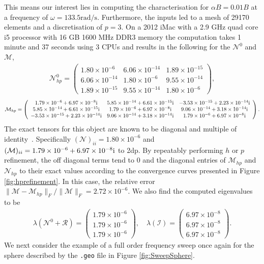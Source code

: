 \noindent
This means our interest lies in computing the characterisation for $ \alpha B = 0.01 B$ at a frequency of $\omega = 133.5 \text{rad/s}$.
Furthermore, the inputs led to a mesh of 29170 elements and a discretisation of $p=3$. On a 2012 iMac with a 2.9 GHz quad core i5 processor with 16 GB 1600 MHz DDR3 memory the computation takes 1 minute and 37 seconds using $3$ CPUs and results in the following for the $\mathcal{N}^0$ and $\mathcal{M}$,
\begin{align*}
\mathcal{N}_{hp}^0 = \left(\begin{array}{ccc}
1.80\times10^{-6} & 6.06\times10^{-14} & 1.89\times10^{-15}\\
6.06\times10^{-14} & 1.80\times10^{-6} & 9.55\times10^{-14}\\
1.89\times10^{-15} & 9.55\times10^{-14} & 1.80\times10^{-6}
\end{array}\right),
\end{align*}
\begin{align*}
\mathcal{M}_{hp} = \left(\begin{array}{ccc}
1.79\times10^{-6}+6.97\times10^{-8}\rm{i} & 5.85\times10^{-14}+6.61\times10^{-15}\rm{i} & -3.53\times10^{-15}+2.23\times10^{-14}\rm{i}\\
5.85\times10^{-14}+6.61\times10^{-15}\rm{i} & 1.79\times10^{-6}+6.97\times10^{-8}\rm{i} & 9.06\times10^{-14}+3.18\times10^{-14}\rm{i}\\
-3.53\times10^{-15}+2.23\times10^{-14}\rm{i} & 9.06\times10^{-14}+3.18\times10^{-14}\rm{i} & 1.79\times10^{-6}+6.97\times10^{-8}\rm{i}
\end{array}\right).
\end{align*}
The exact tensors for this object are known to be diagonal and multiple of identity~\cite{LedgerLionheart2018,Wait1951}. Specifically $(\mathcal{N})_{ii} = 1.80 \times 10^{-6} $ and $(\mathcal{M})_{ii} =  1.79 \times 10^{-6} +6.97 \times 10^{-8} \mathrm{i} $ to 2dp. By repeatably performing $h$ or $p$ refinement, the off diagonal terms tend to $0$ and the diagonal entries of $\mathcal{M}_{hp}$ and  $\mathcal{N}_{hp}$ to their exact values according to the convergence curves presented in Figure \ref{fig:hprefinement}. In this case, the relative error $\| \mathcal{M}- \mathcal{M}_{hp} \|_F / \|\mathcal{M}  \|_F = 2.72 \times 10^{-6}$. We also find the computed eigenvalues to be
\begin{align*}
\lambda(\mathcal{N}^0+\mathcal{R}) = \left(\begin{array}{c}
1.79\times10^{-6}\\1.79\times10^{-6}\\1.79\times10^{-6}
\end{array}\right),\quad
\lambda(\mathcal{I}) = \left(\begin{array}{c}
6.97\times10^{-8}\\6.97\times10^{-8}\\6.97\times10^{-8}
\end{array}\right).
\end{align*}
We next consider the example of a full order frequency sweep once again for the sphere described by the \texttt{.geo} file in Figure \ref{fig:SweepSphere}.
